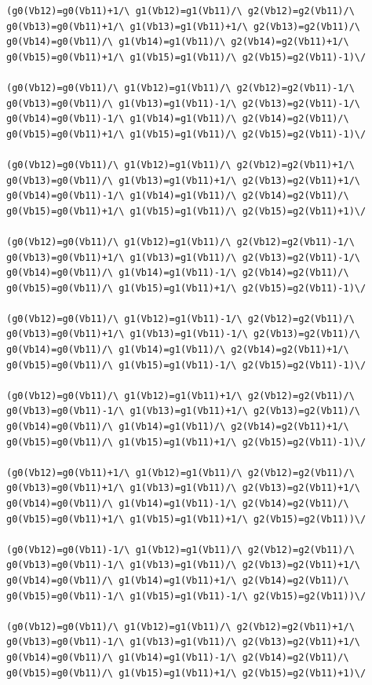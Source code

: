 \begin{appendices}
\begin{lstlisting}
(g0(Vb12)=g0(Vb11)+1/\ g1(Vb12)=g1(Vb11)/\ g2(Vb12)=g2(Vb11)/\ g0(Vb13)=g0(Vb11)+1/\ g1(Vb13)=g1(Vb11)+1/\ g2(Vb13)=g2(Vb11)/\ g0(Vb14)=g0(Vb11)/\ g1(Vb14)=g1(Vb11)/\ g2(Vb14)=g2(Vb11)+1/\ g0(Vb15)=g0(Vb11)+1/\ g1(Vb15)=g1(Vb11)/\ g2(Vb15)=g2(Vb11)-1)\/ 

(g0(Vb12)=g0(Vb11)/\ g1(Vb12)=g1(Vb11)/\ g2(Vb12)=g2(Vb11)-1/\ g0(Vb13)=g0(Vb11)/\ g1(Vb13)=g1(Vb11)-1/\ g2(Vb13)=g2(Vb11)-1/\ g0(Vb14)=g0(Vb11)-1/\ g1(Vb14)=g1(Vb11)/\ g2(Vb14)=g2(Vb11)/\ g0(Vb15)=g0(Vb11)+1/\ g1(Vb15)=g1(Vb11)/\ g2(Vb15)=g2(Vb11)-1)\/ 

(g0(Vb12)=g0(Vb11)/\ g1(Vb12)=g1(Vb11)/\ g2(Vb12)=g2(Vb11)+1/\ g0(Vb13)=g0(Vb11)/\ g1(Vb13)=g1(Vb11)+1/\ g2(Vb13)=g2(Vb11)+1/\ g0(Vb14)=g0(Vb11)-1/\ g1(Vb14)=g1(Vb11)/\ g2(Vb14)=g2(Vb11)/\ g0(Vb15)=g0(Vb11)+1/\ g1(Vb15)=g1(Vb11)/\ g2(Vb15)=g2(Vb11)+1)\/ 

(g0(Vb12)=g0(Vb11)/\ g1(Vb12)=g1(Vb11)/\ g2(Vb12)=g2(Vb11)-1/\ g0(Vb13)=g0(Vb11)+1/\ g1(Vb13)=g1(Vb11)/\ g2(Vb13)=g2(Vb11)-1/\ g0(Vb14)=g0(Vb11)/\ g1(Vb14)=g1(Vb11)-1/\ g2(Vb14)=g2(Vb11)/\ g0(Vb15)=g0(Vb11)/\ g1(Vb15)=g1(Vb11)+1/\ g2(Vb15)=g2(Vb11)-1)\/ 

(g0(Vb12)=g0(Vb11)/\ g1(Vb12)=g1(Vb11)-1/\ g2(Vb12)=g2(Vb11)/\ g0(Vb13)=g0(Vb11)+1/\ g1(Vb13)=g1(Vb11)-1/\ g2(Vb13)=g2(Vb11)/\ g0(Vb14)=g0(Vb11)/\ g1(Vb14)=g1(Vb11)/\ g2(Vb14)=g2(Vb11)+1/\ g0(Vb15)=g0(Vb11)/\ g1(Vb15)=g1(Vb11)-1/\ g2(Vb15)=g2(Vb11)-1)\/ 

(g0(Vb12)=g0(Vb11)/\ g1(Vb12)=g1(Vb11)+1/\ g2(Vb12)=g2(Vb11)/\ g0(Vb13)=g0(Vb11)-1/\ g1(Vb13)=g1(Vb11)+1/\ g2(Vb13)=g2(Vb11)/\ g0(Vb14)=g0(Vb11)/\ g1(Vb14)=g1(Vb11)/\ g2(Vb14)=g2(Vb11)+1/\ g0(Vb15)=g0(Vb11)/\ g1(Vb15)=g1(Vb11)+1/\ g2(Vb15)=g2(Vb11)-1)\/ 

(g0(Vb12)=g0(Vb11)+1/\ g1(Vb12)=g1(Vb11)/\ g2(Vb12)=g2(Vb11)/\ g0(Vb13)=g0(Vb11)+1/\ g1(Vb13)=g1(Vb11)/\ g2(Vb13)=g2(Vb11)+1/\ g0(Vb14)=g0(Vb11)/\ g1(Vb14)=g1(Vb11)-1/\ g2(Vb14)=g2(Vb11)/\ g0(Vb15)=g0(Vb11)+1/\ g1(Vb15)=g1(Vb11)+1/\ g2(Vb15)=g2(Vb11))\/ 

(g0(Vb12)=g0(Vb11)-1/\ g1(Vb12)=g1(Vb11)/\ g2(Vb12)=g2(Vb11)/\ g0(Vb13)=g0(Vb11)-1/\ g1(Vb13)=g1(Vb11)/\ g2(Vb13)=g2(Vb11)+1/\ g0(Vb14)=g0(Vb11)/\ g1(Vb14)=g1(Vb11)+1/\ g2(Vb14)=g2(Vb11)/\ g0(Vb15)=g0(Vb11)-1/\ g1(Vb15)=g1(Vb11)-1/\ g2(Vb15)=g2(Vb11))\/ 

(g0(Vb12)=g0(Vb11)/\ g1(Vb12)=g1(Vb11)/\ g2(Vb12)=g2(Vb11)+1/\ g0(Vb13)=g0(Vb11)-1/\ g1(Vb13)=g1(Vb11)/\ g2(Vb13)=g2(Vb11)+1/\ g0(Vb14)=g0(Vb11)/\ g1(Vb14)=g1(Vb11)-1/\ g2(Vb14)=g2(Vb11)/\ g0(Vb15)=g0(Vb11)/\ g1(Vb15)=g1(Vb11)+1/\ g2(Vb15)=g2(Vb11)+1)\/ 


\end{lstlisting}
\end{appendices}
